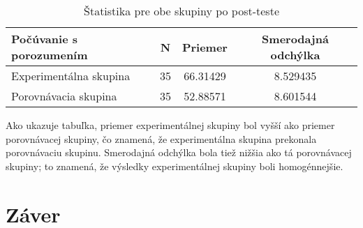 \documentclass[10pt,oneside,slovak,a4paper]{article}
\begin{document}


\begin{table}[tbh]
\centering
\begin{tabular}{@{}|l|c|c|c|@{}}
\toprule
Počúvanie s porozumením & N  & Priemer  & Smerodajná odchýlka \\ \midrule
Experimentálna skupina  & 35 & 66.31429 & 8.529435            \\ \midrule
Porovnávacia skupina    & 35 & 52.88571 & 8.601544            \\ \bottomrule
\end{tabular}
\caption{\label{tab:Štatistika}Štatistika pre obe skupiny po post-teste}
\end{table}

Ako ukazuje tabuľka, priemer experimentálnej skupiny bol vyšší ako priemer porovnávacej skupiny, čo znamená, že experimentálna skupina prekonala porovnávaciu skupinu. Smerodajná odchýlka bola tiež nižšia ako tá porovnávacej skupiny; to znamená, že výsledky experimentálnej skupiny boli homogénnejšie.



\section{Záver} \label{zaver} %






\end{document}
